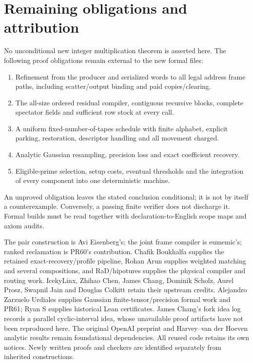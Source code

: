 \documentclass[11pt]{article}
\begin{document}
\section{Remaining obligations and attribution}
No unconditional new integer multiplication theorem is asserted here.
The following proof obligations remain external to the new formal files:
\begin{enumerate}
\item Refinement from the producer and serialized words to all legal address
frame paths, including scatter/output binding and paid copies/clearing.
\item The all-size ordered residual compiler, contiguous recursive blocks,
complete spectator fields and sufficient row stock at every call.
\item A uniform fixed-number-of-tapes schedule with finite alphabet, explicit
parking, restoration, descriptor handling and all movement charged.
\item Analytic Gaussian resampling, precision loss and exact coefficient recovery.
\item Eligible-prime selection, setup costs, eventual thresholds and the
integration of every component into one deterministic machine.
\end{enumerate}
An unproved obligation leaves the stated conclusion conditional; it is not
by itself a counterexample. Conversely, a passing finite verifier does not
discharge it. Formal builds must be read together with declaration-to-English
scope maps and axiom audits.

The pair construction is Avi Eisenberg's; the joint frame compiler is
eumemic's; ranked reclamation is PR60's contribution. Chafik Boukhalfa supplies
the retained exact-recovery/profile pipeline, Rohan Arun supplies weighted
matching and several compositions, and RaD/hipotures supplies the physical
compiler and routing work. IcekyLinx, Zhihao Chen, James Chang, Dominik Scholz,
Aurel Prosz, Swapnil Jain and Douglas Colkitt retain their upstream credits.
Alejandro Zarzuelo Urdiales supplies Gaussian finite-tensor/precision formal
work and PR61; Ryan S supplies historical Lean certificates. James Chang's
fork idea log records a parallel cyclic-interval idea, whose unavailable
proof artifacts have not been reproduced here. The original OpenAI preprint
and Harvey--van der Hoeven analytic results remain foundational dependencies.
All reused code retains its own notices. Newly written proofs and checkers
are identified separately from inherited constructions.
\end{document}
